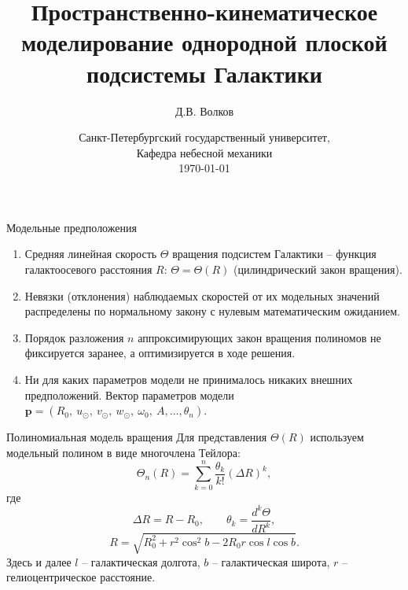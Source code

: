 \documentclass[compress]{beamer}
\begin{document}
\title{Пространственно-кинематическое моделирование однородной плоской подсистемы Галактики}  
\author{Д.В. Волков}
\date{Санкт-Петербургский государственный университет, \\Кафедра небесной механики \\ \today} 
\frame{\titlepage} 

\begin{frame}{Модельные предположения}
	\begin{enumerate}
                \item Средняя линейная скорость $\Theta$ вращения подсистем Галактики -- функция галактоосевого расстояния $R$: $\Theta = \Theta (R)$ (цилиндрический закон вращения).
                \item Невязки (отклонения) наблюдаемых скоростей от их модельных значений распределены по нормальному закону с нулевым математическим ожиданием. 
                \item Порядок разложения $n$ аппроксимирующих закон вращения полиномов не фиксируется заранее, а оптимизируется в ходе решения.
                \item Ни для каких параметров модели не принималось никаких внешних предположений. Вектор параметров модели $\textbf{p} = (R_0,~u_{\odot},~v_{\odot},~w_{\odot},~\omega_0,~A, \ldots, \theta_n)$.
	\end{enumerate}
\end{frame}

\begin{frame}{Полиномиальная модель вращения}
Для представления $\Theta(R)$ используем модельный полином в виде многочлена Тейлора:
	\begin{equation}
		\Theta_n(R) = \sum^n_{k = 0} \frac{\theta_k}{k!} \left( \Delta R \right)^k,
	\end{equation}
где
\begin{equation}
        \Delta R = R - R_0, \qquad \theta_k = \frac{d^k\Theta}{dR^k},
\end{equation}
\begin{equation}
	R = \sqrt{R_0^2 + r^2 \cos^2{b} - 2R_0 r \cos{l} \cos{b}}.
\end{equation}
Здесь и далее $l$ -- галактическая долгота, $b$ -- галактическая широта, $r$ -- гелиоцентрическое расстояние.
\end{frame}
\end{document}
